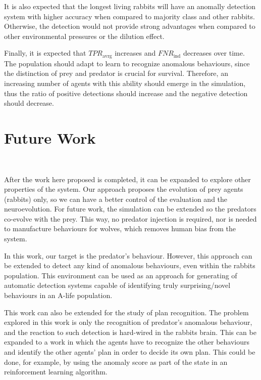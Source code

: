 \documentclass[letterpaper]{article}
\numberwithin{equation}{section}
\numberwithin{theorem}{section}
\numberwithin{lemma}{section}
\numberwithin{df}{section}
\begin{document}
It is also expected that the longest living rabbits will have an anomally detection system with higher accuracy when compared to majority class and other rabbits. Otherwise, the detection would not provide strong advantages when compared to other environmental pressures or the dilution effect.

Finally, it is expected that $TPR_{\text{avrg}}$ increases and $FNR_{\text{ind}}$ decreases over time. The population should adapt to learn to recognize anomalous behaviours, since the distinction of prey and predator is crucial for survival. Therefore, an increasing number of agents with this ability should emerge in the simulation, thus the ratio of positive detections should increase and the negative detection should decrease.

\section{Future Work}
\

After the work here proposed is completed, it can be expanded to explore other properties of the system. Our approach proposes the evolution of prey agents (rabbits) only, so we can have a better control of the evaluation and the neuroevolution. For future work, the simulation can be extended so the predators co-evolve with the prey. This way, no predator injection is required, nor is needed to manufacture behaviours for wolves, which removes human bias from the system.

In this work, our target is the predator's behaviour. However, this approach can be extended to detect any kind of anomalous behaviours, even within the rabbits population. This environment can be used as an approach for generating of automatic detection systems capable of identifying truly surprising/novel behaviours in an A-life population.

This work can also be extended for the study of plan recognition. The problem explored in this work is only the recognition of predator's anomalous behaviour, and the reaction to such detection is hard-wired in the rabbits brain. This can be expanded to a work in which the agents have to recognize the other behaviours and identify the other agents' plan in order to decide its own plan. This could be done, for example, by using the anomaly score as part of the state in an reinforcement learning algorithm.
\end{document}
